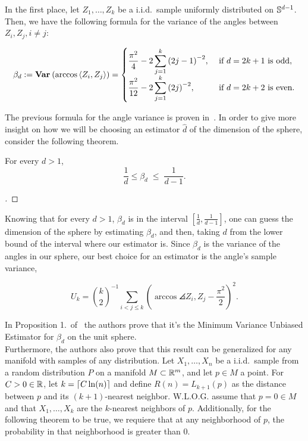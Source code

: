 In the first place, let $Z_1, \ldots, Z_k$ be a i.i.d.\ sample uniformly distributed on $\S^{d-1}$. Then, we have the following formula for the variance of the angles between $Z_i,Z_j, i\neq j$:

\begin{equation}\label{ade:1}\everymath{\displaystyle}
  \beta_d := \Var(\arccos \angles{Z_i,Z_j}) = \begin{cases}
    \frac{\pi^2}{4} - 2 \sum_{j = 1}^{k} {(2j-1)}^{-2}, & \mbox{ if } d = 2k+1 \mbox{ is odd},\\
    \frac{\pi^2}{12}- 2 \sum_{j = 1}^{k} {(2j)}^{-2}, & \mbox{ if } d = 2k+2 \mbox{ is even.}
  \end{cases}
\end{equation}

The previous formula for the angle variance is proven in~\cite{diaz2019local}. In order to give more insight on how we will be choosing an estimator $\widehat{d}$ of the dimension of the sphere, consider the following theorem.

\begin{theorem}\label{ade:T1}
  For every $d > 1$,
  \[ \frac{1}{d} \leq \beta_d \;\leq\; \frac{1}{d-1}. \] 
\end{theorem}
\begin{proof}[]

\end{proof}

\vspace*{1em}

Knowing that for every $d > 1$, $\beta_d$ is in the interval $[\tfrac{1}{d}, \tfrac{1}{d-1}]$, one can guess the dimension of the sphere by estimating $\beta_d$, and then, taking $d$ from the lower bound of the interval where our estimator is. Since $\beta_d$ is the variance of the angles in our sphere, our best choice for an estimator is the angle's sample variance,


\begin{equation}\label{ade:2}
  U_{k} = \binom{k}{2}^{-1} \sum_{i<j\leq k}{\left(
    \arccos\angles{Z_i, Z_j} - \frac{\pi^2}{2} 
    \right)}^{2}.
\end{equation}

In Proposition 1.\ of~\cite{diaz2019local} the authors prove that it's the Minimum Variance Unbiased Estimator for $\beta_d$ on the unit sphere.\\[0.5 em]

Furthermore, the authors also prove that this result can be generalized for any manifold with samples of any distribution. Let $X_1,\ldots, X_n$ be a i.i.d.\ sample from a random distribution $P$ on a manifold $M \subset \R^m$, and let $p \in M$ a point. For $C>0 \in  \R$, let $k = \ceil{C \ln(n)}$ and define $R(n) = L_{k+1}(p)$ as the distance between $p$ and its $(k+1)$-nearest neighbor. W.L.O.G. assume that $p = 0 \in M$ and that $X_1,\ldots, X_k$ are the $k$-nearest neighbors of $p$. Additionally, for the following theorem to be true, we requiere that at any neighborhood of $p$, the probability in that neighborhood is greater than 0.\\[0.5 em]

